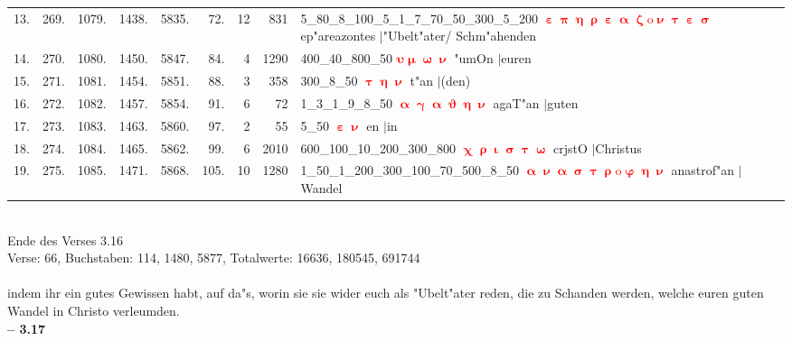 \documentclass[a4paper,10pt,landscape]{article}
\begin{document}
\begin{tabular}{rrrrrrrrp{120mm}}
13.&269.&1079.&1438.&5835.&72.&12&831&5\_80\_8\_100\_5\_1\_7\_70\_50\_300\_5\_200 \textcolor{red}{$\boldsymbol{\upepsilon\uppi\upeta\uprho\upepsilon\upalpha\upzeta\mathrm{o}\upnu\uptau\upepsilon\upsigma}$} ep"areazontes $|$"Ubelt"ater/ Schm"ahenden\\
14.&270.&1080.&1450.&5847.&84.&4&1290&400\_40\_800\_50 \textcolor{red}{$\boldsymbol{\upsilon\upmu\upomega\upnu}$} "umOn $|$euren\\
15.&271.&1081.&1454.&5851.&88.&3&358&300\_8\_50 \textcolor{red}{$\boldsymbol{\uptau\upeta\upnu}$} t"an $|$(den)\\
16.&272.&1082.&1457.&5854.&91.&6&72&1\_3\_1\_9\_8\_50 \textcolor{red}{$\boldsymbol{\upalpha\upgamma\upalpha\upvartheta\upeta\upnu}$} agaT"an $|$guten\\
17.&273.&1083.&1463.&5860.&97.&2&55&5\_50 \textcolor{red}{$\boldsymbol{\upepsilon\upnu}$} en $|$in\\
18.&274.&1084.&1465.&5862.&99.&6&2010&600\_100\_10\_200\_300\_800 \textcolor{red}{$\boldsymbol{\upchi\uprho\upiota\upsigma\uptau\upomega}$} crjstO $|$Christus\\
19.&275.&1085.&1471.&5868.&105.&10&1280&1\_50\_1\_200\_300\_100\_70\_500\_8\_50 \textcolor{red}{$\boldsymbol{\upalpha\upnu\upalpha\upsigma\uptau\uprho\mathrm{o}\upvarphi\upeta\upnu}$} anastrof"an $|$Wandel\\
\end{tabular}\medskip \\
Ende des Verses 3.16\\
Verse: 66, Buchstaben: 114, 1480, 5877, Totalwerte: 16636, 180545, 691744\\
\\
indem ihr ein gutes Gewissen habt, auf da"s, worin sie sie wider euch als "Ubelt"ater reden, die zu Schanden werden, welche euren guten Wandel in Christo verleumden.\\
\newpage 
{\bf -- 3.17}\\
\medskip \\
\end{document}
